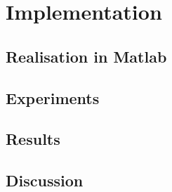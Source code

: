 \chapter{Implementation}
\label{ch:Implementation}

\section{Realisation in Matlab}

\section{Experiments}

\section{Results}

\section{Discussion}

